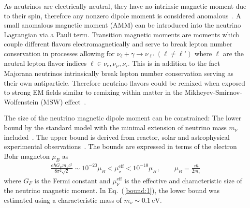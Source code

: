 \documentclass[addchapnum]{ws-rv961x669} %
\newcommand{\req}[1]{Eq.~(\ref{#1})}
\begin{document}
As neutrinos are electrically neutral, they have no intrinsic magnetic moment due to their spin, therefore any nonzero dipole moment is considered anomalous~\cite{Steinmetz:2018ryf}. A small anomalous magnetic moment (AMM) can be introduced into the neutrino Lagrangian via a Pauli term. Transition magnetic moments are moments which couple different flavors electromagnetically and serve to break lepton number conservation in  processes allowing for $\nu_{\ell}+\gamma\rightarrow\nu_{\ell'}\ (\ell\neq\ell')$ where $\ell$ are the neutral lepton flavor indices $\ell\in\nu_{e},\nu_{\mu},\nu_{\tau}$. This is in addition to the fact Majorana neutrinos intrinsically break lepton number conservation serving as their own antiparticle. Therefore neutrino flavors could be remixed when exposed to strong EM fields similar to remixing within matter in the Mikheyev-Smirnov-Wolfenstein (MSW) effect~\citep{Wolfenstein:1977ue,Mikheyev:1985zog}.

The size of the neutrino magnetic dipole moment can be constrained:  The lower bound  by the standard model with the minimal extension of neutrino mass $m_{\nu}$ included~\cite{Fujikawa:1980yx,Shrock:1980vy,Shrock:1982sc}. The upper bound is derived from reactor, solar and astrophysical  experimental observations~\cite{Giunti:2015gga,Canas:2015yoa,Studenikin:2016ykv,AristizabalSierra:2021fuc}. The bounds are expressed in terms of the electron Bohr magneton $\mu_{B}$ as
\begin{align}
    \label{bound:1}
    \frac{e\hbar G_{F}m_{\nu}c^{2}}{8\pi^{2}\sqrt{2}} \sim 10^{-20}\mu_{B}<\mu_{\nu}^\mathrm{eff}<10^{-10}\mu_{B}\,,\qquad\mu_{B}=\frac{e\hbar}{2m_{e}}
\end{align}
where $G_{F}$ is the Fermi constant and $\mu_{\nu}^\mathrm{eff}$ is the effective and characteristic size of the neutrino magnetic moment. In \req{bound:1}, the lower bound was estimated using a characteristic mass of $m_{\nu}\sim0.1~\mathrm{eV}$.




\end{document}
